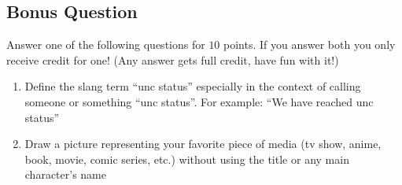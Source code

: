 \documentclass[12pt,addpoints]{exam}
\begin{document}
\begin{questions}
        \newpage
        \section*{Bonus Question}
        \question[10] Answer one of the following questions for $10$ points. If you answer both you
        only receive credit for one! (Any answer gets full credit, have fun with it!)
        \begin{enumerate}
            \item Define the slang term ``unc status'' especially in the context of calling someone or something
                ``unc status''. For example: ``We have reached unc status''
            \item Draw a picture representing your favorite piece of media (tv show, anime, book, movie, comic
                series, etc.) without using the title or any main character's name
        \end{enumerate}
    \end{questions}
\end{document}
